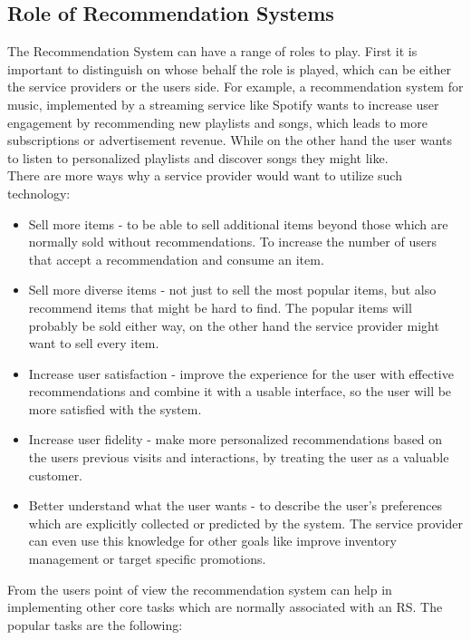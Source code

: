 \documentclass[\myFontSize,a4paper,oneside,hidelinks]{article}
\begin{document}
\subsection{Role of Recommendation Systems}
The Recommendation System can have a range of roles to play. First it is important to distinguish on whose behalf the role is played, which can be either the service providers or the users side. For example, a recommendation system for music, implemented by a streaming service like Spotify wants to increase user engagement by recommending new playlists and songs, which leads to more subscriptions or advertisement revenue. While on the other hand the user wants to listen to personalized playlists and discover songs they might like.\\
There are more ways why a service provider would want to utilize such technology: \cite{pub.1036183961}
\begin{itemize}
\item Sell more items - to be able to sell additional items beyond those which are normally sold without recommendations. To increase the number of users that accept a recommendation and consume an item.
\item Sell more diverse items - not just to sell the most popular items, but also recommend items that might be hard to find. The popular items will probably be sold either way, on the other hand the service provider might want to sell every item.
\item Increase user satisfaction - improve the experience for the user with effective recommendations and combine it with a usable interface, so the user will be more satisfied with the system.
\item Increase user fidelity - make more personalized recommendations based on the users previous visits and interactions, by treating the user as a valuable customer.
\item Better understand what the user wants - to describe the user's preferences which are explicitly collected or predicted by the system. The service provider can even use this knowledge for other goals like improve inventory management or target specific promotions. \\
\end{itemize}
%
From the users point of view the recommendation system can help in implementing other core tasks which are normally associated with an RS. The popular tasks are the following: \cite{Ricci20221}
\end{document}
